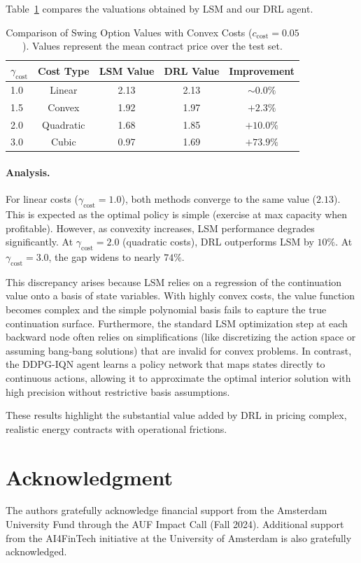 \documentclass[a4paper,fleqn]{cas-dc}
\begin{document}
Table~\ref{tab:convex_results} compares the valuations obtained by LSM and our DRL agent.

\begin{table}[h]
\centering
\caption{Comparison of Swing Option Values with Convex Costs ($c_{\mathrm{cost}}=0.05$). Values represent the mean contract price over the test set.}
\label{tab:convex_results}
\begin{tabular}{lcccc}
\toprule
$\gamma_{\mathrm{cost}}$ & Cost Type & LSM Value & DRL Value & Improvement \\
\midrule
1.0 & Linear & 2.13 & 2.13 & $\sim 0.0\%$ \\
1.5 & Convex & 1.92 & 1.97 & $+2.3\%$ \\
2.0 & Quadratic & 1.68 & 1.85 & $+10.0\%$ \\
3.0 & Cubic & 0.97 & 1.69 & \textbf{$+73.9\%$} \\
\bottomrule
\end{tabular}
\end{table}

\paragraph{Analysis.}
For linear costs ($\gamma_{\mathrm{cost}}=1.0$), both methods converge to the same value ($2.13$). This is expected as the optimal policy is simple (exercise at max capacity when profitable).
However, as convexity increases, LSM performance degrades significantly. At $\gamma_{\mathrm{cost}}=2.0$ (quadratic costs), DRL outperforms LSM by $10\%$. At $\gamma_{\mathrm{cost}}=3.0$, the gap widens to nearly $74\%$.

This discrepancy arises because LSM relies on a regression of the continuation value onto a basis of state variables. With highly convex costs, the value function becomes complex and the simple polynomial basis fails to capture the true continuation surface. Furthermore, the standard LSM optimization step at each backward node often relies on simplifications (like discretizing the action space or assuming bang-bang solutions) that are invalid for convex problems.
In contrast, the DDPG-IQN agent learns a policy network that maps states directly to continuous actions, allowing it to approximate the optimal interior solution with high precision without restrictive basis assumptions.

These results highlight the substantial value added by DRL in pricing complex, realistic energy contracts with operational frictions.

\section*{Acknowledgment}

The authors gratefully acknowledge financial support from the Amsterdam University Fund through the AUF Impact Call (Fall 2024).
Additional support from the AI4FinTech initiative at the University of Amsterdam is also gratefully acknowledged.



\end{document}
